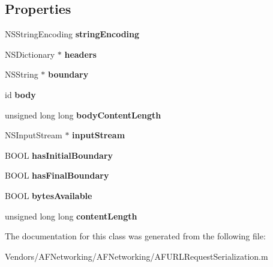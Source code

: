 \subsection*{Properties}
\begin{DoxyCompactItemize}
\item 
\hypertarget{interface_a_f_h_t_t_p_body_part_a842a1899ac06a5ca474a00d1c7a7d7fd}{}N\+S\+String\+Encoding {\bfseries string\+Encoding}\label{interface_a_f_h_t_t_p_body_part_a842a1899ac06a5ca474a00d1c7a7d7fd}

\item 
\hypertarget{interface_a_f_h_t_t_p_body_part_ae26ac134d0864251aed8657f1c18af9f}{}N\+S\+Dictionary $\ast$ {\bfseries headers}\label{interface_a_f_h_t_t_p_body_part_ae26ac134d0864251aed8657f1c18af9f}

\item 
\hypertarget{interface_a_f_h_t_t_p_body_part_a26a57617bd4096e0a7f7ed62b6251923}{}N\+S\+String $\ast$ {\bfseries boundary}\label{interface_a_f_h_t_t_p_body_part_a26a57617bd4096e0a7f7ed62b6251923}

\item 
\hypertarget{interface_a_f_h_t_t_p_body_part_ac1114eccbce0168c1638381fbcfb2c12}{}id {\bfseries body}\label{interface_a_f_h_t_t_p_body_part_ac1114eccbce0168c1638381fbcfb2c12}

\item 
\hypertarget{interface_a_f_h_t_t_p_body_part_a589888098707edf77aa77087dd0411d3}{}unsigned long long {\bfseries body\+Content\+Length}\label{interface_a_f_h_t_t_p_body_part_a589888098707edf77aa77087dd0411d3}

\item 
\hypertarget{interface_a_f_h_t_t_p_body_part_ac3f0670e909127c919888f6d71c3bb54}{}N\+S\+Input\+Stream $\ast$ {\bfseries input\+Stream}\label{interface_a_f_h_t_t_p_body_part_ac3f0670e909127c919888f6d71c3bb54}

\item 
\hypertarget{interface_a_f_h_t_t_p_body_part_aa43219e1933ce7f23e3925a771ae3123}{}B\+O\+O\+L {\bfseries has\+Initial\+Boundary}\label{interface_a_f_h_t_t_p_body_part_aa43219e1933ce7f23e3925a771ae3123}

\item 
\hypertarget{interface_a_f_h_t_t_p_body_part_a744eb48419786f372cf19da986dca356}{}B\+O\+O\+L {\bfseries has\+Final\+Boundary}\label{interface_a_f_h_t_t_p_body_part_a744eb48419786f372cf19da986dca356}

\item 
\hypertarget{interface_a_f_h_t_t_p_body_part_af0479ae737ea32125a69debf91b87664}{}B\+O\+O\+L {\bfseries bytes\+Available}\label{interface_a_f_h_t_t_p_body_part_af0479ae737ea32125a69debf91b87664}

\item 
\hypertarget{interface_a_f_h_t_t_p_body_part_a9e1bea39dee4d8a0c13132f2abd1bd94}{}unsigned long long {\bfseries content\+Length}\label{interface_a_f_h_t_t_p_body_part_a9e1bea39dee4d8a0c13132f2abd1bd94}

\end{DoxyCompactItemize}


The documentation for this class was generated from the following file\+:\begin{DoxyCompactItemize}
\item 
Vendors/\+A\+F\+Networking/\+A\+F\+Networking/A\+F\+U\+R\+L\+Request\+Serialization.\+m\end{DoxyCompactItemize}
